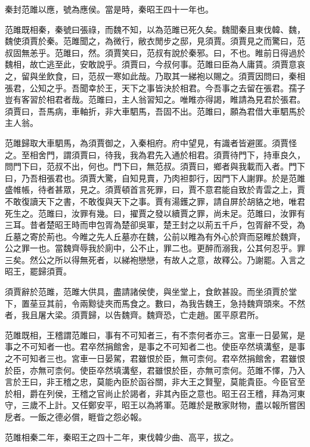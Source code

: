 秦封范雎以應，號為應侯。當是時，秦昭王四十一年也。

范雎既相秦，秦號曰張祿，而魏不知，以為范雎已死久矣。魏聞秦且東伐韓、魏，魏使須賈於秦。范雎聞之，為微行，敝衣閒步之邸，見須賈。須賈見之而驚曰，范叔固無恙乎。范雎曰，然。須賈笑曰，范叔有說於秦邪。曰，不也。睢前日得過於魏相，故亡逃至此，安敢說乎。須賈曰，今叔何事。范雎曰臣為人庸賃。須賈意哀之，留與坐飲食，曰，范叔一寒如此哉。乃取其一綈袍以賜之。須賈因問曰，秦相張君，公知之乎。吾聞幸於王，天下之事皆決於相君。今吾事之去留在張君。孺子豈有客習於相君者哉。范雎曰，主人翁習知之。唯睢亦得謁，睢請為見君於張君。須賈曰，吾馬病，車軸折，非大車駟馬，吾固不出。范雎曰，願為君借大車駟馬於主人翁。

范雎歸取大車駟馬，為須賈御之，入秦相府。府中望見，有識者皆避匿。須賈怪之。至相舍門，謂須賈曰，待我，我為君先入通於相君。須賈待門下，持車良久，問門下曰，范叔不出，何也。門下曰，無范叔。須賈曰，鄉者與我載而入者。門下曰，乃吾相張君也。須賈大驚，自知見賣，乃肉袒厀行，因門下人謝罪。於是范雎盛帷帳，待者甚眾，見之。須賈頓首言死罪，曰，賈不意君能自致於青雲之上，賈不敢復讀天下之書，不敢復與天下之事。賈有湯鑊之罪，請自屏於胡貉之地，唯君死生之。范雎曰，汝罪有幾。曰，擢賈之發以續賈之罪，尚未足。范雎曰，汝罪有三耳。昔者楚昭王時而申包胥為楚卻吳軍，楚王封之以荊五千戶，包胥辭不受，為丘墓之寄於荊也。今睢之先人丘墓亦在魏，公前以睢為有外心於齊而惡睢於魏齊，公之罪一也。當魏齊辱我於廁中，公不止，罪二也。更醉而溺我，公其何忍乎。罪三矣。然公之所以得無死者，以綈袍戀戀，有故人之意，故釋公。乃謝罷。入言之昭王，罷歸須賈。

須賈辭於范雎，范雎大供具，盡請諸侯使，與坐堂上，食飲甚設。而坐須賈於堂下，置莝豆其前，令兩黥徒夾而馬食之。數曰，為我告魏王，急持魏齊頭來。不然者，我且屠大梁。須賈歸，以告魏齊。魏齊恐，亡走趙。匿平原君所。

范雎既相，王稽謂范雎曰，事有不可知者三，有不柰何者亦三。宮車一日晏駕，是事之不可知者一也。君卒然捐館舍，是事之不可知者二也。使臣卒然填溝壑，是事之不可知者三也。宮車一日晏駕，君雖恨於臣，無可柰何。君卒然捐館舍，君雖恨於臣，亦無可柰何。使臣卒然填溝壑，君雖恨於臣，亦無可柰何。范雎不懌，乃入言於王曰，非王稽之忠，莫能內臣於函谷關，非大王之賢聖，莫能貴臣。今臣官至於相，爵在列侯，王稽之官尚止於謁者，非其內臣之意也。昭王召王稽，拜為河東守，三歲不上計。又任鄭安平，昭王以為將軍。范雎於是散家財物，盡以報所嘗困戹者。一飯之德必償，睚眥之怨必報。

范雎相秦二年，秦昭王之四十二年，東伐韓少曲、高平，拔之。

